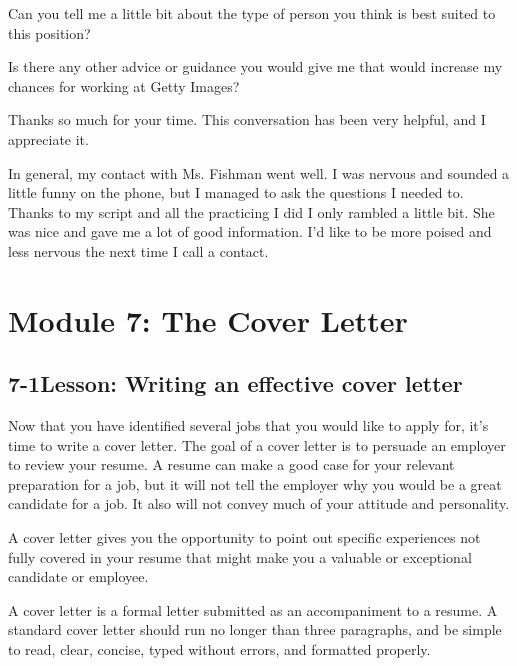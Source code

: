 Can you tell me a little bit about the type of person you think is best suited to this position?

Is there any other advice or guidance you would give me that would increase my chances for working at Getty Images?

Thanks so much for your time. This conversation has been very helpful, and I appreciate it.

In general, my contact with Ms. Fishman went well. I was nervous and sounded a little funny on the phone, but I managed to ask the questions I needed to. Thanks to my script and all the practicing I did I only rambled a little bit. She was nice and gave me a lot of good information. I'd like to be more poised and less nervous the next time I call a contact.
 
 
\pagebreak \section*{Module 7:	The Cover Letter}
\noindent\makebox[\textwidth]{\rule{\linewidth}{0.4pt}}  \localtableofcontents 
\noindent\makebox[\textwidth]{\rule{\linewidth}{0.4pt}} 


\pagebreak \subsection*{7-1\quad Lesson: Writing an effective cover letter}
Now that you have identified several jobs that you would like to apply for, it's time to write a cover letter. The goal of a cover letter is to persuade an employer to review your resume. A resume can make a good case for your relevant preparation for a job, but it will not tell the employer why you would be a great candidate for a job. It also will not convey much of your attitude and personality.

A cover letter gives you the opportunity to point out specific experiences not fully covered in your resume that might make you a valuable or exceptional candidate or employee.

A cover letter is a formal letter submitted as an accompaniment to a resume. A standard cover letter should run no longer than three paragraphs, and be simple to read, clear, concise, typed without errors, and formatted properly.

